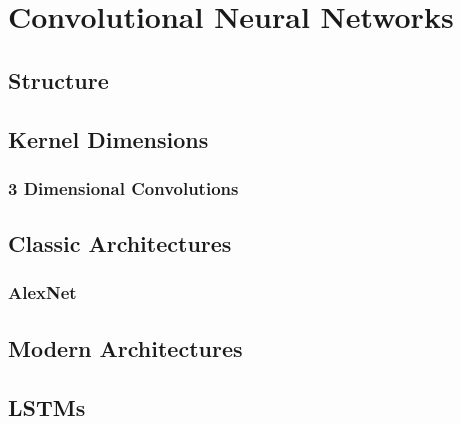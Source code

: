 
\chapter{Convolutional Neural Networks} %

\label{Chapter2} %

\section{Structure}

\section{Kernel Dimensions}

\subsection{3 Dimensional Convolutions}

\section{Classic Architectures}

\subsection{AlexNet}
\label{sec:alexnet}

\section{Modern Architectures}

\section{LSTMs}
\label{sec:LSTM}